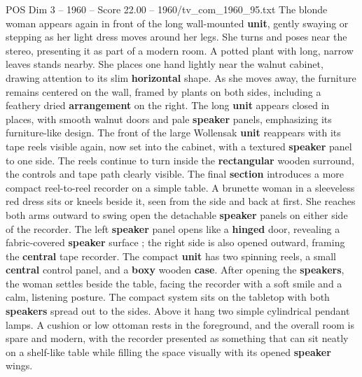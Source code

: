 \begin{textsample}{POS Dim 3 – 1960 – Score 22.00 – 1960/tv\_com\_1960\_95.txt}
The blonde woman appears again in front of the long wall-mounted \textbf{unit}, gently swaying or stepping as her light dress moves around her legs.
She turns and poses near the stereo, presenting it as part of a modern room.
A potted plant with long, narrow leaves stands nearby.
She places one hand lightly near the walnut cabinet, drawing attention to its slim \textbf{horizontal} shape.
As she moves away, the furniture remains centered on the wall, framed by plants on both sides, including a feathery dried \textbf{arrangement} on the right.
The long \textbf{unit} appears closed in places, with smooth walnut doors and pale \textbf{speaker} panels, emphasizing its furniture-like design.
The front of the large Wollensak \textbf{unit} reappears with its tape reels visible again, now set into the cabinet, with a textured \textbf{speaker} panel to one side.
The reels continue to turn inside the \textbf{rectangular} wooden surround, the controls and tape path clearly visible.
The final \textbf{section} introduces a more compact reel-to-reel recorder on a simple table.
A brunette woman in a sleeveless red dress sits or kneels beside it, seen from the side and back at first.
She reaches both arms outward to swing open the detachable \textbf{speaker} panels on either side of the recorder.
The left \textbf{speaker} panel opens like a \textbf{hinged} door, revealing a fabric-covered \textbf{speaker} surface ; the right side is also opened outward, framing the \textbf{central} tape recorder.
The compact \textbf{unit} has two spinning reels, a small \textbf{central} control panel, and a \textbf{boxy} wooden \textbf{case}.
After opening the \textbf{speakers}, the woman settles beside the table, facing the recorder with a soft smile and a calm, listening posture.
The compact system sits on the tabletop with both \textbf{speakers} spread out to the sides.
Above it hang two simple cylindrical pendant lamps.
A cushion or low ottoman rests in the foreground, and the overall room is spare and modern, with the recorder presented as something that can sit neatly on a shelf-like table while filling the space visually with its opened \textbf{speaker} wings.

\end{textsample}

